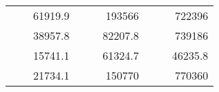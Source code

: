 \begin{table}[H]
\begin{tabular}{|ccrccrccc}
\rowcolor[HTML]{DDFDFF} 
\multicolumn{1}{|c|}{\cellcolor[HTML]{FFFFC7}}                                & \multicolumn{1}{c|}{\cellcolor[HTML]{DDFDFF}}                      & \multicolumn{1}{r|}{\cellcolor[HTML]{DAE8FC}61919.9}   & \multicolumn{1}{c|}{\cellcolor[HTML]{FFFFC7}}                                & \multicolumn{1}{c|}{\cellcolor[HTML]{DDFDFF}}                       & \multicolumn{1}{r|}{\cellcolor[HTML]{DDFDFF}193566}    & \multicolumn{1}{c|}{\cellcolor[HTML]{FFFFC7}}                                & \multicolumn{1}{c|}{\cellcolor[HTML]{DDFDFF}}                      & \multicolumn{1}{r|}{\cellcolor[HTML]{DDFDFF}722396}    \\ \cline{3-3} \cline{6-6} \cline{9-9} 
\multicolumn{1}{|c|}{\cellcolor[HTML]{FFFFC7}}                                & \multicolumn{1}{c|}{\cellcolor[HTML]{DDFDFF}}                      & \multicolumn{1}{r|}{\cellcolor[HTML]{DDFDFF}38957.8}   & \multicolumn{1}{c|}{\cellcolor[HTML]{FFFFC7}}                                & \multicolumn{1}{c|}{\cellcolor[HTML]{DDFDFF}}                       & \multicolumn{1}{r|}{\cellcolor[HTML]{DAE8FC}82207.8}   & \multicolumn{1}{c|}{\cellcolor[HTML]{FFFFC7}}                                & \multicolumn{1}{c|}{\cellcolor[HTML]{DDFDFF}}                      & \multicolumn{1}{r|}{\cellcolor[HTML]{DAE8FC}739186}    \\ \cline{3-3} \cline{6-6} \cline{9-9} 
\rowcolor[HTML]{DDFDFF} 
\multicolumn{1}{|c|}{\cellcolor[HTML]{FFFFC7}}                                & \multicolumn{1}{c|}{\cellcolor[HTML]{DDFDFF}}                      & \multicolumn{1}{r|}{\cellcolor[HTML]{DAE8FC}15741.1}   & \multicolumn{1}{c|}{\cellcolor[HTML]{FFFFC7}}                                & \multicolumn{1}{c|}{\cellcolor[HTML]{DDFDFF}}                       & \multicolumn{1}{r|}{\cellcolor[HTML]{DDFDFF}61324.7}   & \multicolumn{1}{c|}{\cellcolor[HTML]{FFFFC7}}                                & \multicolumn{1}{c|}{\cellcolor[HTML]{DDFDFF}}                      & \multicolumn{1}{r|}{\cellcolor[HTML]{DDFDFF}46235.8}   \\ \cline{3-3} \cline{6-6} \cline{9-9} 
\multicolumn{1}{|c|}{\cellcolor[HTML]{FFFFC7}}                                & \multicolumn{1}{c|}{\cellcolor[HTML]{DDFDFF}}                      & \multicolumn{1}{r|}{\cellcolor[HTML]{DDFDFF}21734.1}   & \multicolumn{1}{c|}{\cellcolor[HTML]{FFFFC7}}                                & \multicolumn{1}{c|}{\cellcolor[HTML]{DDFDFF}}                       & \multicolumn{1}{r|}{\cellcolor[HTML]{DAE8FC}150770}    & \multicolumn{1}{c|}{\cellcolor[HTML]{FFFFC7}}                                & \multicolumn{1}{c|}{\cellcolor[HTML]{DDFDFF}}                      & \multicolumn{1}{r|}{\cellcolor[HTML]{DAE8FC}770360}    \\ \cline{3-3} \cline{6-6} \cline{9-9} 

\end{tabular}
\end{table}
